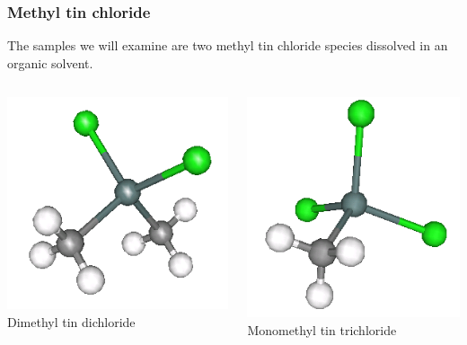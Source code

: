 \documentclass[10pt, xcolor=x11names, compress, handout]{beamer}
\begin{document}
\begin{frame}
  \frametitle{Methyl tin chloride}
  The samples we will examine are two methyl tin chloride species
  dissolved in an organic solvent.

  \begin{columns}
    \begin{column}{0.5\linewidth}
      \begin{center}
        \includegraphics[width=0.5\linewidth]{../noxtal/images/dimethyltin_dichloride.png}\\
      Dimethyl tin dichloride
      \end{center}
    \end{column}
    \begin{column}{0.5\linewidth}
      \begin{center}
        \includegraphics[width=0.5\linewidth]{../noxtal/images/monomethyltin_trichloride.png}\\
        Monomethyl tin trichloride
      \end{center}
    \end{column}
  \end{columns}
  \begin{columns}
    \begin{column}{0.33\linewidth}

\end{column}
\end{columns}
\end{frame}
\end{document}

